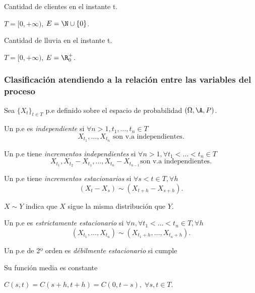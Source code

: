 \begin{ejemplo}[PDTC]
  Cantidad de clientes en el instante t.

  $T = [0, +\infty)$, $E = \N \cup \{0\}$.
\end{ejemplo}

\begin{ejemplo}[PCTC]
  Cantidad de lluvia en el instante t.

  $T = [0, +\infty)$, $E = \R^+_0$.
\end{ejemplo}

\subsubsection{Clasificación atendiendo a la relación entre las variables del proceso}

Sea $\{X_t\}_{t \in T}$ p.e definido sobre el espacio de probabilidad $(\Omega, \A, P)$.

\begin{ndef}
  Un p.e es \emph{independiente} si $\forall n > 1, t_1, \ldots, t_n \in T$ $$X_{t_1}, \ldots, X_{t_n} \text{ son v.a independientes.}$$
\end{ndef}

\begin{ndef}
  Un p.e tiene \emph{incrementos independientes} si $\forall n > 1, \forall t_1 < \ldots < t_n \in T$ $$X_{t_1}, X_{t_2} - X_{t_1}, \ldots, X_{t_n} - X_{t_{n-1}} \text{son v.a independientes.}$$
\end{ndef}

\begin{ndef}
  Un p.e tiene \emph{incrementos estacionarios} si $\forall s < t \in T, \forall h$  $$(X_t - X_s) \sim (X_{t+h} - X_{s+h}).$$
\end{ndef}

\begin{nota}
  $X \sim Y$ indica que $X$ sigue la misma distribución que $Y$.
\end{nota}

\begin{ndef}
  Un p.e es \emph{estrictamente estacionario} si $\forall n, \forall t_1 < \ldots < t_n \in T, \forall h$ $$(X_{t_1}, \ldots, X_{t_n}) \sim (X_{t_1 + h}, \ldots, X_{t_n + h}).$$
\end{ndef}

\begin{ndef}
  Un p.e de 2º orden es \emph{débilmente estacionario} si cumple
  \begin{nlist}
    \item Su función media es constante
    \item $C(s,t) = C(s+h, t+h) = C(0, t-s), \; \forall s,t \in T$.
  \end{nlist}
\end{ndef}

